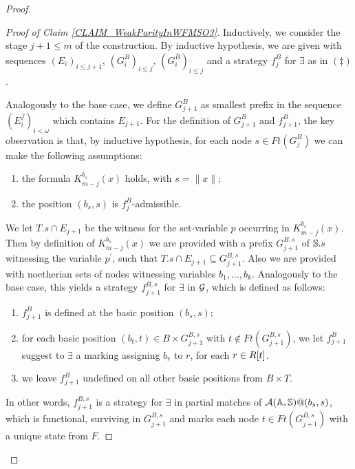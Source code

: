 \begin{proof}
\begin{Iff-LR}
\begin{proof}[Proof of Claim \ref{CLAIM_WeakParityInWFMSO3}]
\bigskip

Inductively, we consider the stage $j+1 \leq m$ of the construction. By inductive hypothesis, we are given with sequences $(E_i)_{i\leq {j+1}}$, $(G_i^{B})_{i\leq j}$, $(G_i^{\overline{B}})_{i\leq j}$ and a strategy $f^{B}_j$ for $\exists$ as in $(\ddag)$.

Analogously to the base case, we define $G_{j+1}^{\overline{B}}$ as smallest prefix in the sequence $(E^{\overline{f}}_i)_{i< \omega}$ which contains $E_{j+1}$. For the definition of $G_{j+1}^{B}$ and $f^{B}_{j+1}$, the key observation is that, by inductive hypothesis, for each node $s \in \mathit{Ft}(G^{B}_j)$ we can make the following assumptions:
 \begin{enumerate}
   \item the formula $K_{m-j}^{b_s}(x)$ holds, with $s = \|x\|$;
   \item the position $(b_s,s)$ is $f^{B}_j$-admissible.
 \end{enumerate}

We let $T.s \cap E_{j+1}$ be the witness for the set-variable $p$ occurring in $K_{m-j}^{b_s}(x)$. Then by definition of $K_{m-j}^{b_s}(x)$ we are provided with a prefix $G_{j+1}^{B,s}$ of $\mathbb{S}.s$ witnessing the variable $p^{\prime}$, such that ${T.s} \cap E_{j+1} \subseteq G_{j+1}^{B,s}$. Also we are provided with noetherian sets of nodes witnessing variables $b_1,\dots,b_k$. Analogously to the base case, this yields a strategy $f^{B,s}_{j+1}$ for $\exists$ in $\mathcal{G}$, which is defined as follows:
 \begin{enumerate}
   \item $f^{B}_{j+1}$ is defined at the basic position $(b_s,s)$;
   \item for each basic position $(b_t,t)\in B \times G_{j+1}^{B,s}$ with $t \not\in \mathit{Ft}(G_{j+1}^{B,s})$, we let $f^{B}_{j+1}$ suggest to $\exists$ a marking assigning $b_r$ to $r$, for each $r \in R[t]$.
   \item we leave $f^{B}_{j+1}$ undefined on all other basic positions from $B \times T$.
 \end{enumerate}
In other words, $f^{B,s}_{j+1}$ is a strategy for $\exists$ in partial matches of $\mathcal{A}(\mathbb{A},\mathbb{S})@(b_s,s)$, which is functional, surviving in $G_{j+1}^{B,s}$ and marks each node $t \in \mathit{Ft}(G_{j+1}^{B,s})$ with a unique state from $F$.

\smallskip


\end{proof}
\end{Iff-LR}
\end{proof}
